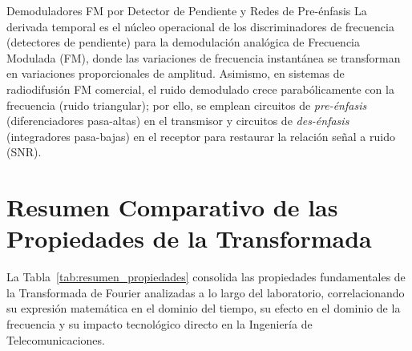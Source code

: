 \documentclass[11pt,a4paper]{article}
\begin{document}
\begin{telecomAppBox}{Demoduladores FM por Detector de Pendiente y Redes de Pre-\'enfasis}
La derivada temporal es el n\'ucleo operacional de los discriminadores de frecuencia (detectores de pendiente) para la demodulaci\'on anal\'ogica de Frecuencia Modulada (FM), donde las variaciones de frecuencia instant\'anea se transforman en variaciones proporcionales de amplitud. Asimismo, en sistemas de radiodifusi\'on FM comercial, el ruido demodulado crece parab\'olicamente con la frecuencia (ruido triangular); por ello, se emplean circuitos de \textit{pre-\'enfasis} (diferenciadores pasa-altas) en el transmisor y circuitos de \textit{des-\'enfasis} (integradores pasa-bajas) en el receptor para restaurar la relaci\'on se\~nal a ruido (SNR).
\end{telecomAppBox}

\newpage
\section{Resumen Comparativo de las Propiedades de la Transformada}

La Tabla~\ref{tab:resumen_propiedades} consolida las propiedades fundamentales de la Transformada de Fourier analizadas a lo largo del laboratorio, correlacionando su expresi\'on matem\'atica en el dominio del tiempo, su efecto en el dominio de la frecuencia y su impacto tecnol\'ogico directo en la Ingenier\'ia de Telecomunicaciones.
\end{document}
